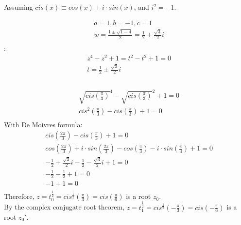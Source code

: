 \documentclass{myassignment}
\begin{document}
	Assuming $cis(x) \equiv cos(x) + i\cdot sin(x)$, and $i^2=-1$.
	\begin{answer}
		\begin{eqnarray}
			&a = 1, b = -1, c = 1 \\
			&w = \frac{1\pm\sqrt{1-4}}{2} = \frac{1}{2}\pm\frac{\sqrt{3}}{2}i\\
		\end{eqnarray}
		:\\
		\begin{eqnarray}
			&z^4 - z^2 + 1 = t^2-t^2+1 = 0\\
			&t = {\frac{1}{2}\pm\frac{\sqrt{3}}{2}i}\\
		\end{eqnarray}
		\\
		\begin{eqnarray}
			&\sqrt{cis(\frac{\pi}{3})}^4 - \sqrt{cis(\frac{\pi}{3})}^2 + 1 = 0\\
			&cis^2(\frac{\pi}{3}) - cis(\frac{\pi}{3}) + 1 = 0\\
		\end{eqnarray}
		With De Moivres formula:
		\begin{eqnarray}
			&cis(\frac{2\pi}{3}) - cis(\frac{\pi}{3}) + 1 = 0\\
			&cos(\frac{2\pi}{3}) + i\cdot sin(\frac{2\pi}{3}) - cos(\frac{\pi}{3}) - i\cdot sin(\frac{\pi}{3}) + 1 = 0\\
			&-\frac{1}{2} + \frac{\sqrt{3}}{2}i - \frac{1}{2} - \frac{\sqrt{3}}{2} i + 1 = 0\\
			&-\frac{1}{2} - \frac{1}{2} + 1 = 0\\
			&-1 + 1 = 0\\
		\end{eqnarray}
		Therefore, $z = t_0^{\frac{1}{2}} = cis^{\frac{1}{2}}(\frac{\pi}{3}) = cis(\frac{\pi}{6})$ is a root $z_0$.\\
		By the complex conjugate root theorem, $z=t_1^{\frac{1}{2}}=cis^{\frac{1}{2}}(-\frac{\pi}{3})=cis(-\frac{\pi}{6})$ is a root $z_0'$.\blackqed
		

\end{answer}
\end{document}
